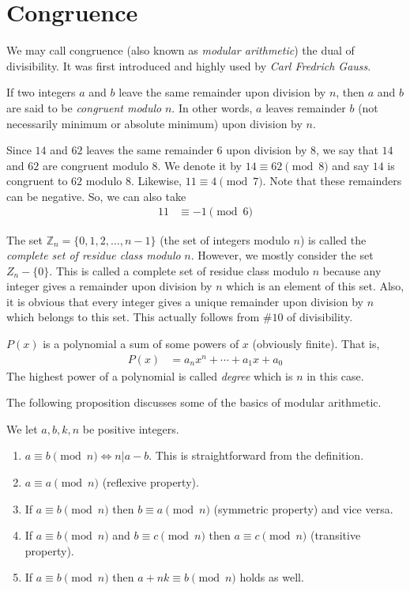 \documentclass[bnt.tex]{subfile}
\begin{document}
	\section{Congruence}
		We may call congruence (also known as \textit{modular arithmetic}) the dual of divisibility. It was first introduced and highly
		used by \textit{Carl Fredrich Gauss}.
			\begin{definition}
				If two integers $a$ and $b$ leave the same remainder upon division by $n$, then $a$ and $b$ are said to be \textit{congruent modulo} $n$. In other words, $a$ leaves remainder $b$ (not necessarily minimum or absolute minimum) upon division by $n$.
			\end{definition}
			
			\begin{example}
				Since $14$ and $62$ leaves the same remainder $6$ upon division by $8$, we say that $14$ and $62$ are congruent modulo $8$. We denote it by $14\equiv62\pmod8$ and say $14$ is congruent to $62$ modulo $8$. Likewise, $11\equiv4\pmod7$. Note that these remainders can be negative. So, we can also take
					\begin{align*}
						11 & \equiv-1\pmod6
					\end{align*}
			\end{example}
		The set $\mathbb{Z}_n=\{0,1,2,\ldots,n-1\}$ (the set of integers modulo $n$) is called the \textit{complete set of residue class modulo} $n$. However, we mostly consider the set $Z_n-\{0\}$. This is called a complete set of residue class modulo $n$ because any integer gives a remainder upon division by $n$ which is an element of this set. Also, it is obvious that every integer gives a unique remainder upon division by $n$ which belongs to this set. This actually follows from $\#10$ of divisibility.
			\begin{definition}
				$P(x)$ is a polynomial a sum of some powers of $x$ (obviously finite). That is,
					\begin{align*}
						P(x) & = a_nx^n+\cdots+a_1x+a_0
					\end{align*}
				The highest power of a polynomial is called \textit{degree} which is $n$ in this case.
			\end{definition}
		The following proposition discusses some of the basics of modular arithmetic.
			\begin{proposition}
				We let $a,b,k,n$ be positive integers.
					\begin{enumerate}[(1)]
						\item $a\equiv b\pmod n\iff n|a-b$. This is straightforward from the definition.
						\item $a\equiv a\pmod n$ (reflexive property).
						\item If $a\equiv b\pmod n$ then $b\equiv a\pmod n$ (symmetric property) and vice versa.
						\item If $a\equiv b\pmod n$ and $b\equiv c\pmod n$ then $a\equiv c\pmod n$ (transitive property).
						\item If $a\equiv b\pmod n$ then $a+nk\equiv b\pmod n$ holds as well.
					\end{enumerate}
			\end{proposition}
			
\end{document}
